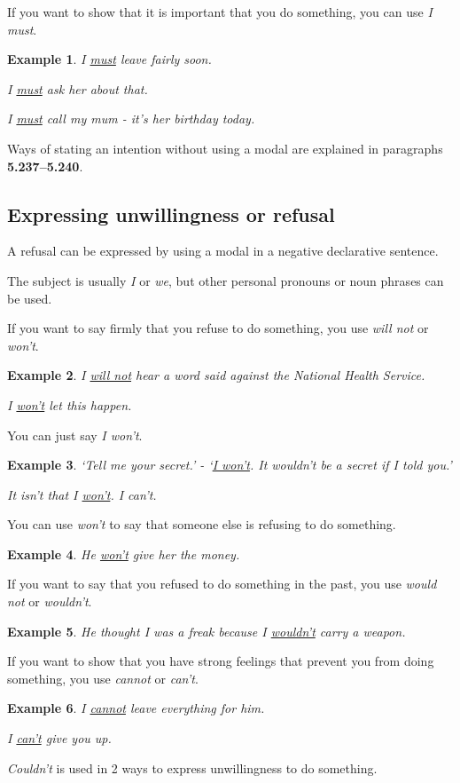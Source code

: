 \documentclass[oneside]{book}
\numberwithin{equation}{section}
\newtheorem{example}{Example}[section]
\begin{document}
%
\noindent{} If you want to show that it is important that you do something, you can use \textit{I must}.
\begin{example}
    I \underline{must} leave fairly soon.
    
    I \underline{must} ask her about that.
    
    I \underline{must} call my mum - it's her birthday today.
\end{example}
%
\noindent{} Ways of stating an intention without using a modal are explained in paragraphs \textbf{5.237--5.240}.

\subsection{Expressing unwillingness or refusal}
\noindent{} A refusal can be expressed by using a modal in a negative declarative sentence.

The subject is usually \textit{I} or \textit{we}, but other personal pronouns or noun phrases can be used.

%
\noindent{} If you want to say firmly that you refuse to do something, you use \textit{will not} or \textit{won't}.
\begin{example}
    I \underline{will not} hear a word said against the National Health Service.
    
    I \underline{won't} let this happen.
\end{example}
You can just say \textit{I won't}.
\begin{example}
    `Tell me your secret.' - `\underline{I won't}. It wouldn't be a secret if I told you.'
    
    It isn't that I \underline{won't}. I can't.
\end{example}
You can use \textit{won't} to say that someone else is refusing to do something.
\begin{example}
    He \underline{won't} give her the money.
\end{example}
%
\noindent{} If you want to say that you refused to do something in the past, you use \textit{would not} or \textit{wouldn't}.
\begin{example}
    He thought I was a freak because I \underline{wouldn't} carry a weapon.
\end{example}
%
\noindent{} If you want to show that you have strong feelings that prevent you from doing something, you use \textit{cannot} or \textit{can't}.
\begin{example}
    I \underline{cannot} leave everything for him.
    
    I \underline{can't} give you up.
\end{example}
%
\noindent{} \textit{Couldn't} is used in 2 ways to express unwillingness to do something.
\end{document}
